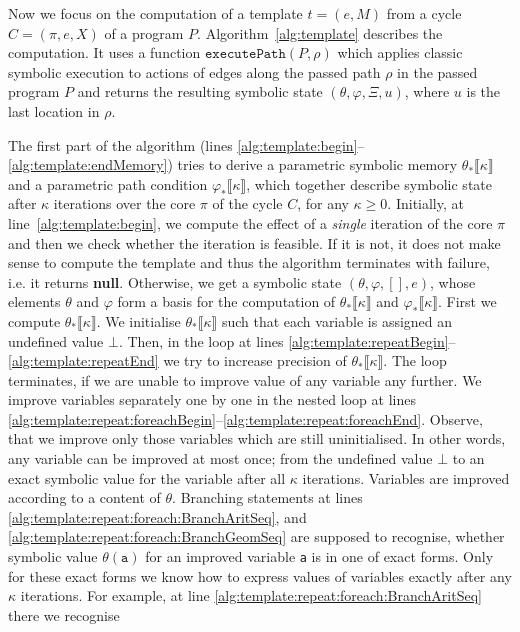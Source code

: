\documentclass{sig-alternate}%
\newcommand{\prm}[1]{\ensuremath{\llbracket #1 \rrbracket}}
\begin{document}
Now we focus on the computation of a template $t = (e, M)$ from a
cycle $C = (\pi,e,X)$ of a program $P$. Algorithm~\ref{alg:template}
describes the computation. It uses a function
$\texttt{executePath}(P,\rho)$ which applies classic symbolic
execution to actions of edges along the passed path $\rho$ in the
passed program $P$ and returns the resulting symbolic state
$(\theta,\varphi,\Xi,u)$, where $u$ is the last location in $\rho$.

The first part of the algorithm (lines
\ref{alg:template:begin}--\ref{alg:template:endMemory}) tries to
derive a parametric symbolic memory $\theta_*\prm{\kappa}$ and a
parametric path condition $\varphi_*\prm{\kappa}$, which together
describe symbolic state after $\kappa$ iterations over the core $\pi$
of the cycle $C$, for any $\kappa \geq 0$. Initially, at
line~\ref{alg:template:begin}, we compute the effect of a
\emph{single} iteration of the core $\pi$ and then we check whether
the iteration is feasible. If it is not, it does not make sense to
compute the template and thus the algorithm terminates with failure,
i.e. it returns \textbf{null}. Otherwise, we get a symbolic state
$(\theta,\varphi,[],e)$, whose elements $\theta$ and $\varphi$ form a
basis for the computation of $\theta_*\prm{\kappa}$ and
$\varphi_*\prm{\kappa}$. First we compute $\theta_*\prm{\kappa}$. We
initialise $\theta_*\prm{\kappa}$ such that each variable is assigned
an undefined value $\bot$. Then, in the loop at lines
\ref{alg:template:repeatBegin}--\ref{alg:template:repeatEnd} we try to
increase precision of $\theta_*\prm{\kappa}$. The loop terminates, if
we are unable to improve value of any variable any further. We improve
variables separately one by one in the nested loop at lines
\ref{alg:template:repeat:foreachBegin}--\ref{alg:template:repeat:foreachEnd}.
Observe, that we improve only those variables which are still
uninitialised. In other words, any variable can be improved at most
once; from the undefined value $\bot$ to an exact symbolic value for
the variable after all $\kappa$ iterations. Variables are improved
according to a content of $\theta$. Branching statements at lines
\ref{alg:template:repeat:foreach:BranchAritSeq}, and
\ref{alg:template:repeat:foreach:BranchGeomSeq} are supposed to
recognise, whether symbolic value $\theta(\texttt{a})$ for an improved
variable \texttt{a} is in one of exact forms. Only for these exact
forms we know how to express values of variables exactly after any
$\kappa$ iterations. For example, at line
\ref{alg:template:repeat:foreach:BranchAritSeq} there we recognise
\end{document}

